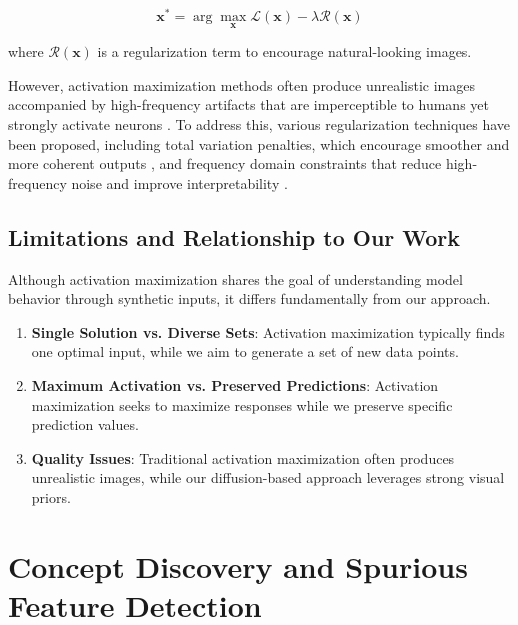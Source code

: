 \documentclass[licencjacka,en]{pracamgr}
\begin{document}
\begin{equation}
\mathbf{x}^* = \arg\max_{\mathbf{x}} \mathcal{L}(\mathbf{x}) - \lambda \mathcal{R}(\mathbf{x})
\label{eq:activation_maximization}
\end{equation}

where $\mathcal{R}(\mathbf{x})$ is a regularization term to encourage natural-looking images.

However, activation maximization methods often produce unrealistic images accompanied by high-frequency artifacts that are imperceptible to humans yet strongly activate neurons \cite{shinkle2025visualizingcontrollingcorticalresponses, nanfack2023adversarialattacksinterpretationneuron, zhu2025representationunderstandingactivationmaximization}. To address this, various regularization techniques have been proposed, including total variation penalties, which encourage smoother and more coherent outputs \cite{mahendran2014understandingdeepimagerepresentations}, and frequency domain constraints that reduce high-frequency noise and improve interpretability \cite{olah2017feature}.

\subsection{Limitations and Relationship to Our Work}

Although activation maximization shares the goal of understanding model behavior through synthetic inputs, it differs fundamentally from our approach.

\begin{enumerate}
\item \textbf{Single Solution vs. Diverse Sets}: Activation maximization typically finds one optimal input, while we aim to generate a set of new data points.

\item \textbf{Maximum Activation vs. Preserved Predictions}: Activation maximization seeks to maximize responses while we preserve specific prediction values.

\item \textbf{Quality Issues}: Traditional activation maximization often produces unrealistic images, while our diffusion-based approach leverages strong visual priors.
\end{enumerate}

\section{Concept Discovery and Spurious Feature Detection}
\end{document}
